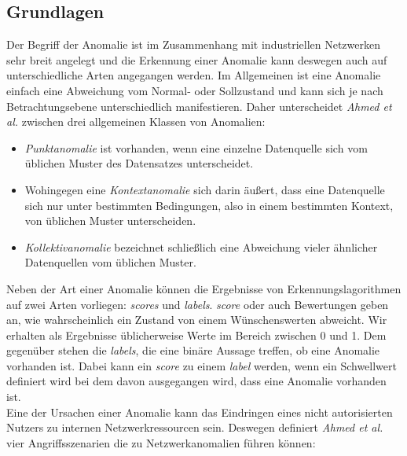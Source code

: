 \subsection{Grundlagen}
Der Begriff der Anomalie ist im Zusammenhang mit industriellen Netzwerken sehr breit angelegt und die Erkennung einer Anomalie kann deswegen auch auf unterschiedliche Arten angegangen werden. Im Allgemeinen ist eine Anomalie einfach eine Abweichung vom Normal- oder Sollzustand und kann sich je nach Betrachtungsebene unterschiedlich manifestieren. Daher unterscheidet \textit{Ahmed et al.}\cite{ahmed2016survey} zwischen drei allgemeinen Klassen von Anomalien:
\begin{itemize}
\item \textit{Punktanomalie} ist vorhanden, wenn eine einzelne Datenquelle sich vom üblichen Muster des Datensatzes unterscheidet.
\item Wohingegen eine \textit{Kontextanomalie} sich darin äußert, dass eine Datenquelle sich nur unter bestimmten Bedingungen, also in einem bestimmten Kontext, von üblichen Muster unterscheiden.
\item \textit{Kollektivanomalie} bezeichnet schließlich eine Abweichung vieler ähnlicher Datenquellen vom üblichen Muster.
\end{itemize}
Neben der Art einer Anomalie können die Ergebnisse von Erkennungslagorithmen auf zwei Arten vorliegen: \textit{\Glspl{score}} und \textit{\Glspl{label}}. \textit{\Gls{score}} oder auch Bewertungen geben an, wie wahrscheinlich ein Zustand von einem Wünschenswerten abweicht. Wir erhalten als Ergebnisse üblicherweise Werte im Bereich zwischen 0 und 1. Dem gegenüber stehen die \textit{\Glspl{label}}, die eine binäre Aussage treffen, ob eine Anomalie vorhanden ist. Dabei kann ein \textit{\Gls{score}} zu einem \textit{\Gls{label}} werden, wenn ein Schwellwert definiert wird bei dem davon ausgegangen wird, dass eine Anomalie vorhanden ist. \cite[p. ~22]{ahmed2016survey}\\
Eine der Ursachen einer Anomalie kann das Eindringen eines nicht autorisierten Nutzers zu internen Netzwerkressourcen sein. Deswegen definiert \textit{Ahmed et al.} \cite{ahmed2016survey} vier Angriffsszenarien die zu Netzwerkanomalien führen können:
